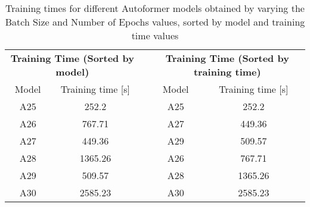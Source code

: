 \begin{table}[]
    \begin{tabular}{ccccc}
    \multicolumn{2}{c}{\textbf{Training   Time (Sorted by model)}} &  & \multicolumn{2}{c}{\textbf{Training Time (Sorted   by training time)}} \\
    Model             & Training time {[}s{]}                      &  & Model                 & Training time {[}s{]}                          \\
    A25               & \cellcolor[HTML]{63BE7B}252.2              &  & A25                   & \cellcolor[HTML]{63BE7B}252.2                  \\
    A26               & \cellcolor[HTML]{FFE383}767.71             &  & A27                   & \cellcolor[HTML]{B2D47F}449.36                 \\
    A27               & \cellcolor[HTML]{B2D47F}449.36             &  & A29                   & \cellcolor[HTML]{CADB80}509.57                 \\
    A28               & \cellcolor[HTML]{FDBB7B}1365.26            &  & A26                   & \cellcolor[HTML]{FFE383}767.71                 \\
    A29               & \cellcolor[HTML]{CADB80}509.57             &  & A28                   & \cellcolor[HTML]{FDBB7B}1365.26                \\
    A30               & \cellcolor[HTML]{F8696B}2585.23            &  & A30                   & \cellcolor[HTML]{F8696B}2585.23               
    \end{tabular}
    \caption{Training times for different Autoformer models obtained by varying the Batch Size and Number of Epochs values, sorted by model and training time values}
    \label{A5_T}
    \end{table}